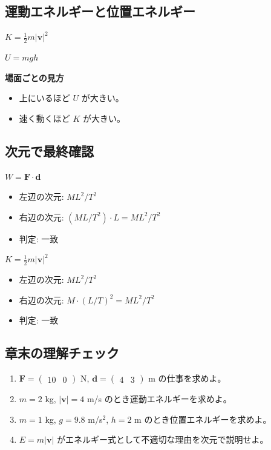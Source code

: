\documentclass[dvipdfmx,paper=a4,fleqn,11pt]{jlreq}
\newcommand{\formula}[1]{%
  \vspace{10pt}%
  \begin{center}{\large\bfseries\boldmath\(\displaystyle #1\)}\end{center}%
  \vspace{4pt}%
}
\newcommand{\dimcheck}[3]{%
  \begin{itemize}
    \item 左辺の次元: #1
    \item 右辺の次元: #2
    \item 判定: #3
  \end{itemize}
}
\begin{document}
\subsection{運動エネルギーと位置エネルギー}
\formula{K=\frac{1}{2}m|\bm{v}|^2}
\formula{U=mgh}

\begin{center}
\end{center}

\textbf{場面ごとの見方}
\begin{itemize}
  \item 上にいるほど $U$ が大きい。
  \item 速く動くほど $K$ が大きい。
\end{itemize}

\subsection{次元で最終確認}
\formula{W=\bm{F}\cdot\bm{d}}
\dimcheck{$ML^2/T^2$}{$(ML/T^2)\cdot L=ML^2/T^2$}{一致}

\formula{K=\frac{1}{2}m|\bm{v}|^2}
\dimcheck{$ML^2/T^2$}{$M\cdot(L/T)^2=ML^2/T^2$}{一致}

\subsection{章末の理解チェック}
\begin{enumerate}
  \item $\bm{F}=\begin{pmatrix}10 & 0\end{pmatrix}$ N, $\bm{d}=\begin{pmatrix}4 & 3\end{pmatrix}$ m の仕事を求めよ。
  \item $m=2$ kg, $|\bm{v}|=4$ m/s のとき運動エネルギーを求めよ。
  \item $m=1$ kg, $g=9.8$ m/s$^2$, $h=2$ m のとき位置エネルギーを求めよ。
  \item $E=m|\bm{v}|$ がエネルギー式として不適切な理由を次元で説明せよ。
\end{enumerate}
\end{document}
